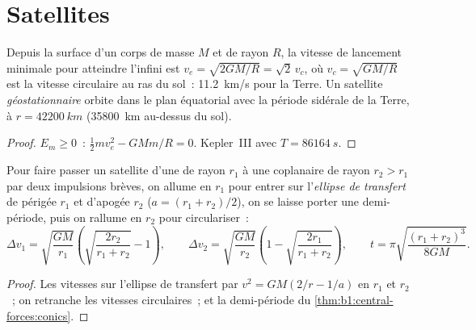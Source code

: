 \section{Satellites}

\begin{proposition}\label{prop:b1:central-forces:escape}
Depuis la surface d'un corps de masse $M$ et de rayon $R$, la vitesse de
lancement minimale pour atteindre l'infini est
$v_e = \sqrt{2GM/R} = \sqrt2\,v_c$, où $v_c = \sqrt{GM/R}$ est la vitesse
circulaire au ras du sol~: \qty{11.2}{km/s} pour la Terre. Un satellite
\emph{géostationnaire} orbite dans le plan équatorial avec la période
sidérale de la Terre, à $r = \qty{42200}{km}$ (\qty{35800}{km}
au-dessus du sol).
\end{proposition}

\begin{proof}
$E_m \geq 0$~: $\tfrac12 mv_e^2 - GMm/R = 0$. Kepler~III avec $T = \qty{86164}{s}$.
\end{proof}

\begin{proposition}\label{prop:b1:central-forces:hohmann}
Pour faire passer un satellite d'une  de rayon $r_1$ à
une  coplanaire de rayon $r_2 > r_1$ par deux
impulsions brèves, on allume en $r_1$ pour entrer sur l'\emph{ellipse de
transfert} de périgée $r_1$ et d'apogée $r_2$ ($a = (r_1 + r_2)/2$), on
se laisse porter une demi-période, puis on rallume en $r_2$ pour
circulariser~:
\[
\Delta v_1 = \sqrt{\frac{GM}{r_1}}\left(\sqrt{\frac{2r_2}{r_1 + r_2}} - 1\right),
\qquad
\Delta v_2 = \sqrt{\frac{GM}{r_2}}\left(1 - \sqrt{\frac{2r_1}{r_1 + r_2}}\right),
\qquad
t = \pi\sqrt{\frac{(r_1 + r_2)^3}{8GM}} .
\]
\end{proposition}

\begin{proof}
Les vitesses sur l'ellipse de transfert par $v^2 = GM(2/r - 1/a)$ en
$r_1$ et $r_2$~; on retranche les vitesses circulaires~; et la demi-période
du \cref{thm:b1:central-forces:conics}.
\end{proof}

